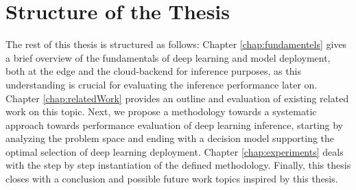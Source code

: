 \section{Structure of the Thesis}
The rest of this thesis is structured as follows: 
Chapter \ref{chap:fundamentels} gives a brief overview of the fundamentals of deep learning and model deployment, both at the edge and the cloud-backend for inference purposes, as this understanding is crucial for evaluating the inference performance later on.
Chapter \ref{chap:relatedWork} provides an outline and evaluation of existing related work on this topic. 
Next, we propose a methodology towards a systematic approach towards performance evaluation of deep learning inference, starting by analyzing the problem space and ending with a decision model supporting the optimal selection of deep learning deployment.
Chapter \ref{chap:experiments} deals with the step by step instantiation of the defined methodology.
Finally, this thesis closes with a conclusion and possible future work topics inspired by this thesis.
